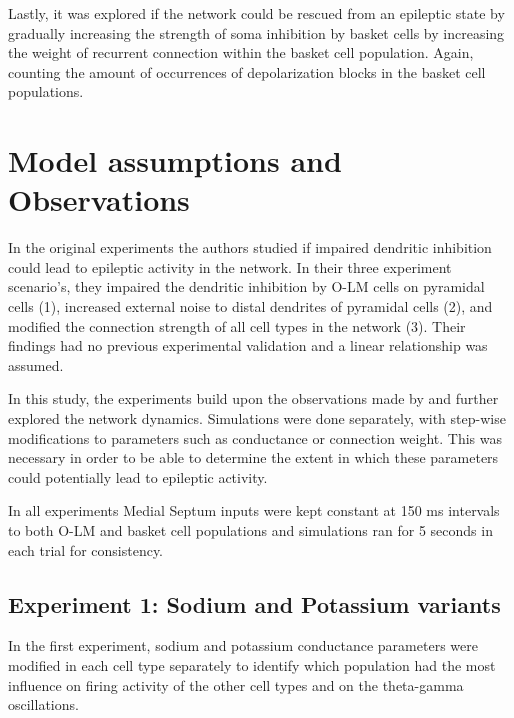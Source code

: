 Lastly, it was explored if the network could be rescued from an epileptic state by gradually increasing the strength of soma inhibition by basket cells 
by increasing the weight of recurrent connection within the basket cell population. Again, counting the amount of occurrences of depolarization blocks 
in the basket cell populations.

\section{Model assumptions and Observations}
In the original experiments \textcite{sanjayImpairedDendriticInhibition2015} the authors studied if impaired dendritic 
inhibition could lead to epileptic activity in the network.
In their three experiment scenario's, they impaired the dendritic inhibition by O-LM cells on pyramidal cells (1), increased external noise to distal 
dendrites of pyramidal cells (2), and modified the connection strength of all cell types in the network (3). 
Their findings had no previous experimental validation and a linear relationship was assumed.

In this study, the experiments build upon the observations made by \textcite{sanjayImpairedDendriticInhibition2015} and further explored the network dynamics.
Simulations were done separately, with step-wise modifications to parameters such as conductance or connection weight.
This was necessary in order to be able to determine the extent in which these parameters could potentially lead to epileptic activity.

In all experiments Medial Septum inputs were kept constant at 150 ms intervals to both O-LM and basket cell populations 
and simulations ran for 5 seconds in each trial for consistency.

\subsection{Experiment 1: Sodium and Potassium variants}
In the first experiment, sodium and potassium conductance parameters were modified
in each cell type separately to identify which population had the most influence
on firing activity of the other cell types and on the theta-gamma oscillations.

